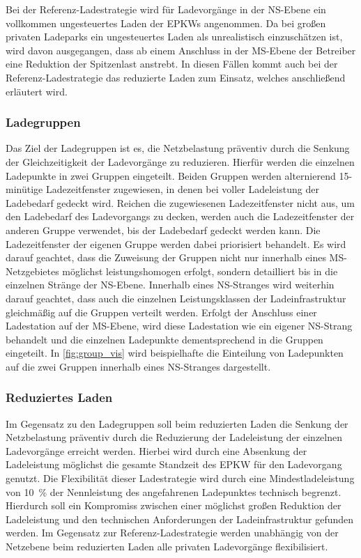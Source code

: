 Bei der Referenz-Ladestrategie wird für Ladevorgänge in der \gls{NS}-Ebene ein vollkommen ungesteuertes Laden der \glspl{EPKW} angenommen.
Da bei großen privaten Ladeparks ein ungesteuertes Laden als unrealistisch einzuschätzen ist, wird davon ausgegangen, dass ab einem Anschluss in der \gls{MS}-Ebene der Betreiber eine Reduktion der Spitzenlast anstrebt.
In diesen Fällen kommt auch bei der Referenz-Ladestrategie das reduzierte Laden zum Einsatz, welches anschließend erläutert wird.


\subsubsection{Ladegruppen}

Das Ziel der Ladegruppen ist es, die Netzbelastung präventiv durch die Senkung der Gleichzeitigkeit der Ladevorgänge zu reduzieren.
Hierfür werden die einzelnen Ladepunkte in zwei Gruppen eingeteilt.
Beiden Gruppen werden alternierend 15-minütige Ladezeitfenster zugewiesen, in denen bei voller Ladeleistung der Ladebedarf gedeckt wird.
Reichen die zugewiesenen Ladezeitfenster nicht aus, um den Ladebedarf des Ladevorgangs zu decken, werden auch die Ladezeitfenster der anderen Gruppe verwendet, bis der Ladebedarf gedeckt werden kann.
Die Ladezeitfenster der eigenen Gruppe werden dabei priorisiert behandelt.
Es wird darauf geachtet, dass die Zuweisung der Gruppen nicht nur innerhalb eines \gls{MS}-Netzgebietes möglichst leistungshomogen erfolgt, sondern detailliert bis in die einzelnen Stränge der \gls{NS}-Ebene.
Innerhalb eines \gls{NS}-Stranges wird weiterhin darauf geachtet, dass auch die einzelnen Leistungsklassen der Ladeinfrastruktur gleichmäßig auf die Gruppen verteilt werden.
Erfolgt der Anschluss einer Ladestation auf der \gls{MS}-Ebene, wird diese Ladestation wie ein eigener \gls{NS}-Strang behandelt und die einzelnen Ladepunkte dementsprechend in die Gruppen eingeteilt.
In \autoref{fig:group_vis} wird beispielhafte die Einteilung von Ladepunkten auf die zwei Gruppen innerhalb eines \gls{NS}-Stranges dargestellt. \cite{Schachler2021}




\subsubsection{Reduziertes Laden}

Im Gegensatz zu den Ladegruppen soll beim reduzierten Laden die Senkung der Netzbelastung präventiv durch die Reduzierung der Ladeleistung der einzelnen Ladevorgänge erreicht werden.
Hierbei wird durch eine Absenkung der Ladeleistung möglichst die gesamte Standzeit des \gls{EPKW} für den Ladevorgang genutzt.
Die Flexibilität dieser Ladestrategie wird durch eine Mindestladeleistung von \SI{10}{\percent} der Nennleistung des angefahrenen Ladepunktes technisch begrenzt.
Hierdurch soll ein Kompromiss zwischen einer möglichst großen Reduktion der Ladeleistung und den technischen Anforderungen der Ladeinfrastruktur gefunden werden.
Im Gegensatz zur Referenz-Ladestrategie werden unabhängig von der Netzebene beim reduzierten Laden alle privaten Ladevorgänge flexibilisiert. \cite{Schachler2021}


